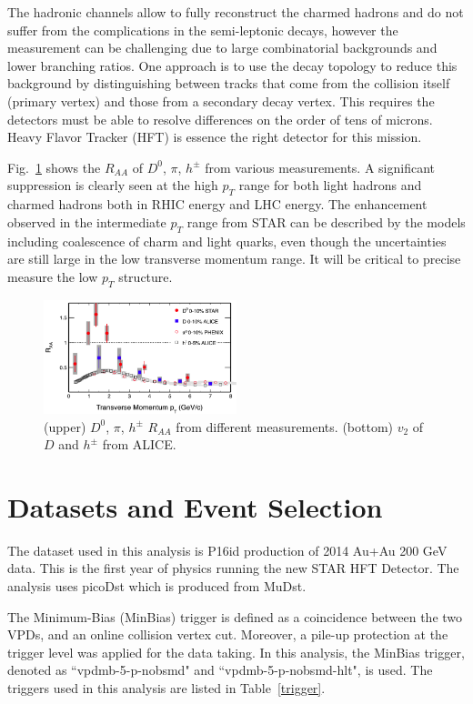 \documentclass[a4paper]{article}
\begin{document}
The hadronic channels allow to fully reconstruct the charmed hadrons and do not suffer from the complications in the semi-leptonic decays, however the measurement can be challenging due to large combinatorial backgrounds and lower branching ratios. One approach is to use the decay topology to reduce this background by distinguishing between tracks that come from the collision itself (primary vertex) and those from a secondary decay vertex. This requires the detectors must be able to resolve differences on the order of tens of microns. Heavy Flavor Tracker (HFT) is essence the right detector for this mission.

Fig.~\ref{fig:BeforeHFT} shows the $R_{AA}$ of $D^0$, $\pi$, $h^{\pm}$ from various measurements. A significant suppression is clearly seen at the high $p_T$ range for both light hadrons and charmed hadrons both in RHIC energy and LHC energy. The enhancement observed in the intermediate $p_T$ range from STAR can be described by the models including coalescence of charm and light quarks, even though the uncertainties are still large in the low transverse momentum range. It will be critical to precise measure the low $p_T$ structure.

\begin{figure}
\centering
\includegraphics[width=0.5\textwidth]{fig/BeforeHFT.png}
\caption{(upper) $D^0$, $\pi$, $h^{\pm}$ $R_{AA}$ from different measurements. (bottom) $v_2$ of $D$ and $h^{\pm}$ from ALICE.}
\label{fig:BeforeHFT} 
\end{figure}

\section{\label{dataset}Datasets and Event Selection}

The dataset used in this analysis is P16id production of 2014 Au+Au 200 GeV data. This is the first year of physics running the new STAR HFT Detector. The analysis uses picoDst which is produced from MuDst.

The Minimum-Bias (MinBias) trigger is defined as a coincidence between the two VPDs, and an online collision vertex cut. Moreover, a pile-up protection at the trigger level was applied for the data taking. In this analysis, the MinBias trigger, denoted as ``vpdmb-5-p-nobsmd" and ``vpdmb-5-p-nobsmd-hlt", is used. The triggers used in this analysis are listed in Table~\ref{trigger}.
\end{document}
